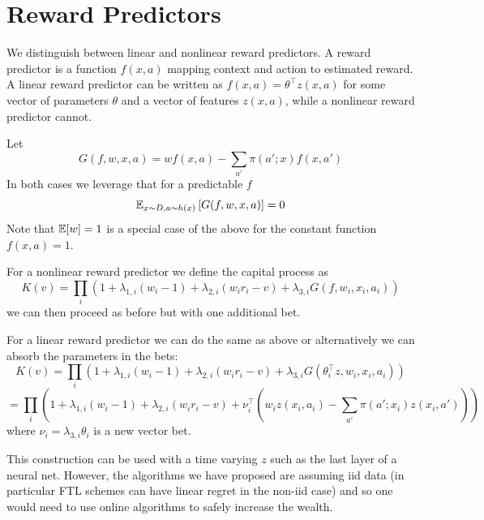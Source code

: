\section{Reward Predictors}
\label{app:reward-predictors}
We distinguish between linear and nonlinear reward predictors.
A reward predictor is a function $f(x,a)$ mapping
context and action to estimated reward. A linear 
reward predictor can be written
as $f(x,a)=\theta^\top z(x,a)$ for some vector of parameters
$\theta$ and a vector of features $z(x,a)$, while a 
nonlinear reward predictor cannot. 

Let
\[
G(f,w,x,a)= w f(x,a) - \sum_{a'} \pi(a';x) f(x,a')
\]
In both cases we leverage that for a predictable $f$
\[
\mathbb{E}_{x\sim D,a\sim h(x)}\left[G(f,w,x,a)\right] = 0
\]
Note that $\mathbb{E}[w]=1$ is a special case of the above 
for the constant function $f(x,a)=1$. 

For a nonlinear reward predictor we define the capital 
process as
\[
K(v)=\prod_{i} \left(1+\lambda_{1,i} (w_i -1) 
+ \lambda_{2,i} (w_i r_i -v) 
+ \lambda_{3,i} G(f,w_i,x_i,a_i)\right)
\]
we can then proceed as before but with one additional
bet.

For a linear reward predictor we can do the same
as above or alternatively we can absorb the 
parameters in the bets:
\[
K(v)=\prod_{i} \left(1+\lambda_{1,i} (w_i -1) 
+ \lambda_{2,i} (w_i r_i -v) 
+ \lambda_{3,i} G(\theta_i^\top z, w_i,x_i,a_i)\right)
\]
\[
=\prod_{i} \left(1+\lambda_{1,i} (w_i -1) 
+ \lambda_{2,i} (w_i r_i -v) 
+ \nu_i^\top \left(w_i z(x_i,a_i) - \sum_{a'} \pi(a';x_i) z(x_i,a') \right)\right)
\]
where $\nu_i = \lambda_{3,i}\theta_i$ is a new vector bet.

This construction can be used with a time varying $z$
such as the last layer of a neural net. However, the algorithms
we have proposed are assuming iid data (in particular FTL schemes
can have linear regret in the non-iid case) and so one would need to use online algorithms to safely increase the wealth.
